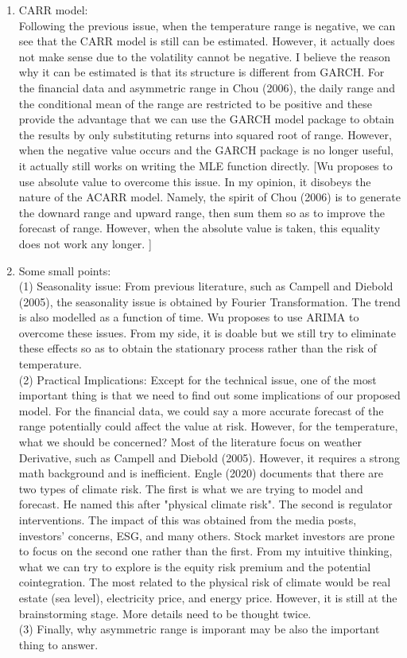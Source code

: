 \documentclass{article}
\begin{document}
\begin{enumerate}
		\item CARR model: ~\\
		Following the previous issue, when the temperature range is negative, we can see that the CARR model is still can be estimated. However, it actually does not make sense due to the volatility cannot be negative. I believe the reason why it can be estimated is that its structure is different from GARCH. For the financial data and asymmetric range in Chou (2006), the daily range and the conditional mean of the range are restricted to be positive and these provide the advantage that we can use the GARCH model package to obtain the results by only substituting returns into squared root of range. However, when the negative value occurs and the GARCH package is no longer useful, it actually still works on writing the MLE function directly. [Wu proposes to use absolute value to overcome this issue. In my opinion, it disobeys the nature of the ACARR model. Namely, the spirit of Chou (2006) is to generate the downard range and upward range, then sum them so as to improve the forecast of range. However, when the absolute value is taken, this equality does not work any longer. ]
		
		\item Some small points:~\\
		(1) Seasonality issue: From previous literature, such as Campell and Diebold (2005), the seasonality issue is obtained by Fourier Transformation. The trend is also modelled as a function of time. Wu proposes to use ARIMA to overcome these issues. From my side, it is doable but we still try to eliminate these effects so as to obtain the stationary process rather than the risk of temperature. 
		~\\
		
		(2) Practical Implications: Except for the technical issue, one of the most important thing is that we need to find out some implications of our proposed model. For the financial data, we could say a more accurate forecast of the range potentially could affect the value at risk. However, for the temperature, what we should be concerned? Most of the literature focus on weather Derivative, such as Campell and Diebold (2005). However, it requires a strong math background and is inefficient. Engle (2020) documents that there are two types of climate risk. The first is what we are trying to model and forecast. He named this after "physical climate risk". The second is regulator interventions. The impact of this was obtained from the media posts, investors' concerns, ESG, and many others. Stock market investors are prone to focus on the second one rather than the first. 	From my intuitive thinking, what we can try to explore is the equity risk premium and the potential cointegration. The most related to the physical risk of climate would be real estate (sea level), electricity price, and energy price. However, it is still at the brainstorming stage. More details need to be thought twice.
		~\\
		(3) Finally, why asymmetric range is imporant may be also the important thing to answer.
	\end{enumerate}	
	
\end{document}
